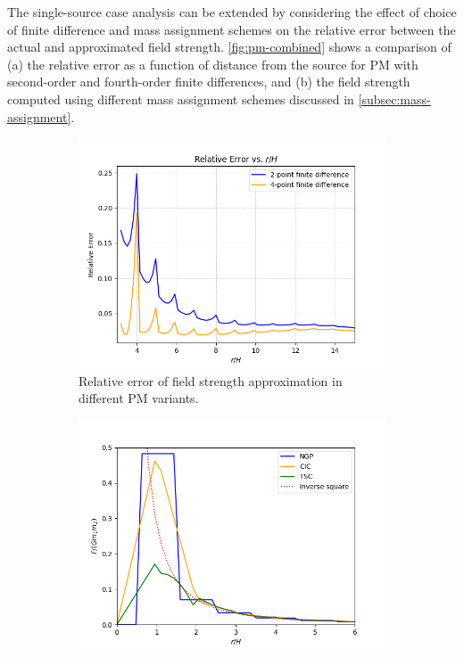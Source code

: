 The single-source case analysis can be extended by considering the effect of choice of finite difference and mass assignment schemes on the relative error between the actual and approximated field strength.
\autoref{fig:pm-combined} shows a comparison of (a) the relative error as a function of distance from the source for PM with second-order and fourth-order finite differences, and (b) the field strength computed using different mass assignment schemes discussed in \autoref{subsec:mass-assignment}.
\begin{figure}[htp]
    \centering
    \begin{subfigure}[t]{0.48\textwidth}
        \centering
        \includegraphics[width=\linewidth]{img/pm/pm-finite-diff-err.png}
        \caption{Relative error of field strength approximation in different PM variants.}
        \label{fig:pm-finite-diff-err}
    \end{subfigure}
    \hfill
    \begin{subfigure}[t]{0.48\textwidth}
        \centering
        \includegraphics[width=\linewidth]{img/pm/pm-mass-assignment.png}

\end{subfigure}
\end{figure}
